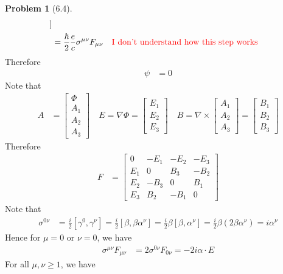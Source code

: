 \documentclass[twoside,11pt]{article}
\theoremstyle{definition}
\newtheorem{problem}{Problem}
\theoremstyle{remark}
\begin{document}
\begin{problem}[6.4]
\begin{align*}
    ]\\
    &= \frac{\hbar}{2}\frac{e}{c}\sigma^{\mu\nu}F_{\mu\nu} 
    \quad\text{\color{red}I don't understand how this step works}
\end{align*}
Therefore 
\begin{align*}
    [(\partial - \frac{e}{c}A)^2
    -\frac{he}{2c}\sigma^{\mu\nu}F_{\mu\nu}
    - m^2c^2]
    \psi &= 0
\end{align*}
Note that 
\begin{align*}
    A &= \begin{bmatrix}
        \Phi\\ A_1 \\ A_2 \\ A_3
    \end{bmatrix}\quad
    E = \nabla\Phi = \begin{bmatrix}
        E_1 \\ E_2 \\ E_3
    \end{bmatrix}\quad
    B = \nabla\times
    \begin{bmatrix}
        A_1 \\ A_2 \\ A_3
    \end{bmatrix} = \begin{bmatrix}
        B_1 \\ B_2 \\ B_3
    \end{bmatrix}
\end{align*}
Therefore
\begin{align*}
    F &= \begin{bmatrix}
        0 & -E_1 & -E_2 & -E_3\\
        E_1 & 0 & B_3 & -B_2\\
        E_2 & -B_3 & 0 & B_1\\
        E_3 & B_2 & -B_1 & 0
    \end{bmatrix}
\end{align*}
Note that
\begin{align*}
    \sigma^{0\nu} &= 
    \frac{i}{2}[\gamma^0, \gamma^\nu] = \frac{i}{2}[\beta,\beta\alpha^\nu]
    = \frac{i}{2}\beta[\beta, \alpha^\nu] = \frac{i}{2}\beta(2\beta\alpha^\nu)
    = i\alpha^\nu
\end{align*}
Hence for $\mu=0$ or $\nu=0$, we have 
\begin{align*}
    \sigma^{\mu\nu}F_{\mu\nu} &= 2\sigma^{0\nu}F_{0\nu}
    = -2i\alpha\cdot E
\end{align*}
For all $\mu,\nu\geq 1$, we have

\end{problem}
\end{document}
